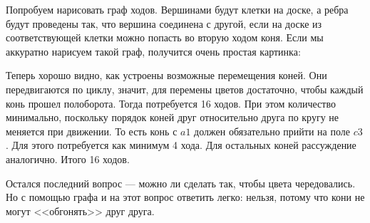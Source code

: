 Попробуем нарисовать граф ходов. Вершинами будут клетки на
доске, а ребра будут проведены так, что вершина соединена
с другой, если на доске из соответствующей клетки можно
попасть во вторую ходом коня. Если мы аккуратно нарисуем
такой граф, получится очень простая картинка:
\begin{center}
\end{center}
Теперь хорошо видно, как устроены возможные перемещения коней. Они
передвигаются по циклу, значит, для перемены цветов достаточно,
чтобы каждый конь прошел полоборота. Тогда потребуется 16 ходов.
При этом количество минимально, поскольку порядок коней друг
относительно друга по кругу не меняется при движении. То есть
конь с $a1$ должен обязательно прийти на поле $c3$. Для этого
потребуется как минимум 4 хода. Для остальных коней рассуждение
аналогично. Итого 16 ходов.

Остался последний вопрос --- можно ли сделать так, чтобы цвета
чередовались. Но с помощью графа и на этот вопрос ответить легко:
нельзя, потому что кони не могут <<обгонять>> друг друга.

